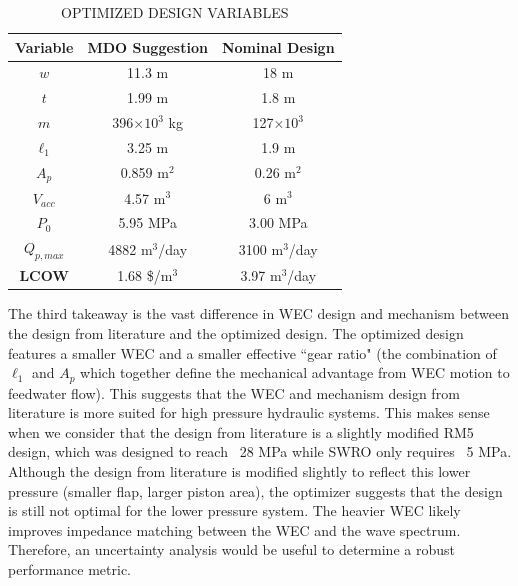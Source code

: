 \documentclass[twocolumn,10pt]{asme2e}
\begin{document}
\begin{table}
    \centering
    \caption{OPTIMIZED DESIGN VARIABLES}
    \begin{tabular}{ccc}
        \hline
        \textbf{Variable} & \textbf{MDO Suggestion} & \textbf{Nominal Design} \cite{YJecon2017}\\
        \hline
        $w$ & 11.3 m & 18 m \\
        $t$ & 1.99 m & 1.8 m \\
        $m$ & 396$\times10^3$ kg & 127$\times10^3$ \\
        $\ell_1$ & 3.25 m & 1.9 m \\
        $A_p$ & 0.859 m$^2$ & 0.26 m$^2$ \\
        $V_{acc}$ & 4.57 m$^3$ & 6 m$^3$ \\
        $P_0$ & 5.95 MPa & 3.00 MPa \\
        $Q_{p,max}$ & 4882 m$^3$/day & 3100 m$^3$/day \\
        \hline
        \textbf{LCOW} & 1.68 \$/m$^3$ & 3.97 m$^3$/day \\
        \hline
    \end{tabular}
    \label{tab:opt}
\end{table}


The third takeaway is the vast difference in WEC design and mechanism between the design from literature and the optimized design. The optimized design features a smaller WEC and a smaller effective ``gear ratio" (the combination of $\ell_1$ and $A_p$ which together define the mechanical advantage from WEC motion to feedwater flow). This suggests that the WEC and mechanism design from literature is more suited for high pressure hydraulic systems. This makes sense when we consider that the design from literature \cite{YJecon2017} is a slightly modified RM5 \cite{rm5} design, which was designed to reach ~28 MPa while SWRO only requires ~5 MPa. Although the design from literature is modified slightly to reflect this lower pressure (smaller flap, larger piston area), the optimizer suggests that the design is still not optimal for the lower pressure system. The heavier WEC likely improves impedance matching between the WEC and the wave spectrum. Therefore, an uncertainty analysis would be useful to determine a robust performance metric. 

\end{document}
